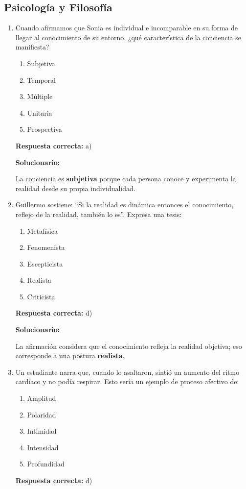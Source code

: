 \subsection*{Psicología y Filosofía}

\begin{enumerate}[resume]

	
	\item Cuando afirmamos que Sonia es individual e incomparable en su forma de llegar al conocimiento de su entorno, ¿qué característica de la conciencia se manifiesta?
	\begin{enumerate}[label=\alph*)]
		\item Subjetiva
		\item Temporal
		\item Múltiple
		\item Unitaria
		\item Prospectiva
	\end{enumerate}
	\textbf{Respuesta correcta:} a)
	
	\vspace{2mm}
	\textbf{Solucionario:}
	
	La conciencia es \textbf{subjetiva} porque cada persona conoce y experimenta la realidad desde su propia individualidad.
	
	
	
	\vspace{6mm}
	
	\item Guillermo sostiene: ``Si la realidad es dinámica entonces el conocimiento, reflejo de la realidad, también lo es''. Expresa una tesis:
	\begin{enumerate}[label=\alph*)]
		\item Metafísica
		\item Fenomenista
		\item Escepticista
		\item Realista
		\item Criticista
	\end{enumerate}
	\textbf{Respuesta correcta:} d)
	
	\vspace{2mm}
	\textbf{Solucionario:}
	
	La afirmación considera que el conocimiento refleja la realidad objetiva; eso corresponde a una postura \textbf{realista}.
	

	
	\vspace{6mm}
	
	\item Un estudiante narra que, cuando lo asaltaron, sintió un aumento del ritmo cardíaco y no podía respirar. Esto sería un ejemplo de proceso afectivo de:
	\begin{enumerate}[label=\alph*)]
		\item Amplitud
		\item Polaridad
		\item Intimidad
		\item Intensidad
		\item Profundidad
	\end{enumerate}
	\textbf{Respuesta correcta:} d)
	

\end{enumerate}
